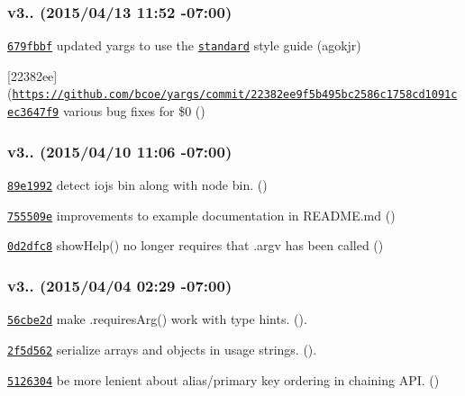 \subsubsection*{v3.. (2015/04/13 11\+:52 -\/07\+:00)}


\begin{DoxyItemize}
\item \href{https://github.com/bcoe/yargs/commit/679fbbf55904030ccee8a2635e8e5f46551ab2f0}{\tt 679fbbf} updated yargs to use the \href{https://github.com/feross/standard}{\tt standard} style guide (agokjr)
\item \mbox{[}22382ee\mbox{]}(\href{https://github.com/bcoe/yargs/commit/22382ee9f5b495bc2586c1758cd1091cec3647f9}{\tt https\+://github.\+com/bcoe/yargs/commit/22382ee9f5b495bc2586c1758cd1091cec3647f9} various bug fixes for \$0 ()
\end{DoxyItemize}

\subsubsection*{v3.. (2015/04/10 11\+:06 -\/07\+:00)}


\begin{DoxyItemize}
\item \href{https://github.com/bcoe/yargs/commit/89e1992a004ba73609b5f9ee6890c4060857aba4}{\tt 89e1992} detect iojs bin along with node bin. ()
\item \href{https://github.com/bcoe/yargs/commit/755509ea90041e5f7833bba3b8c5deffe56f0aab}{\tt 755509e} improvements to example documentation in R\+E\+A\+D\+M\+E.\+md ()
\item \href{https://github.com/bcoe/yargs/commit/0d2dfc822a43418242908ad97ddd5291a1b35dc6}{\tt 0d2dfc8} show\+Help() no longer requires that .argv has been called ()
\end{DoxyItemize}

\subsubsection*{v3.. (2015/04/04 02\+:29 -\/07\+:00)}


\begin{DoxyItemize}
\item \href{https://github.com/bcoe/yargs/commit/56cbe2ddd33dc176dcbf97ba40559864a9f114e4}{\tt 56cbe2d} make .requires\+Arg() work with type hints. ().
\item \href{https://github.com/bcoe/yargs/commit/2f5d5624f736741deeedf6a664d57bc4d857bdd0}{\tt 2f5d562} serialize arrays and objects in usage strings. ().
\item \href{https://github.com/bcoe/yargs/commit/5126304dd18351fc28f10530616fdd9361e0af98}{\tt 5126304} be more lenient about alias/primary key ordering in chaining A\+PI. ()
\end{DoxyItemize}

